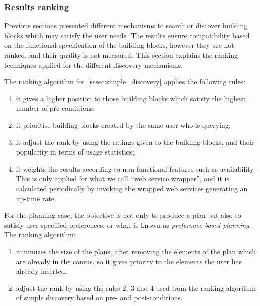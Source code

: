 \subsubsection{Results ranking}
\label{sssec:ranking}

Previous sections presented different mechanisms to search or discover building blocks which may satisfy the user needs.
The results ensure compatibility based on the functional specification of the building blocks, however they are not
ranked, and their quality is not measured. This section explains the ranking techniques applied for the different
discovery mechanisms.

The ranking algorithm for~\ref{sssec:simple_discovery} applies the following rules:
\begin{enumerate}
 \item it gives a higher position to those building blocks which satisfy the highest number of pre-conditions;
 \item it prioritise building blocks created by the same user who is querying;
 \item it adjust the rank by using the ratings given to the building blocks, and their popularity in terms of usage statistics;
 \item it weights the results according to non-functional features such as availability. This is only applied for what we call
``web service wrapper'', and it is calculated periodically by invoking the wrapped web services generating an up-time rate.
\end{enumerate}

For the planning case, the objective is not only to produce a plan but also to satisfy user-specified preferences, or what is
known as \emph{preference-based planning}. The ranking algorithm:
\begin{enumerate}
 \item minimizes the size of the plans, after removing the elements of the plan which are already in the canvas, so it gives
priority to the elements the user has already inserted,
 \item adjust the rank by using the rules 2, 3 and 4 used from the ranking algorithm of simple discovery based on 
pre- and post-conditions.
\end{enumerate}
